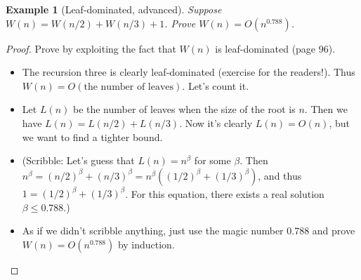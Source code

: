\documentclass[11pt,a4paper,oneside,microtype,nokorean]{oblivoir}
\newtheorem{example}{Example}
\begin{document}
\begin{example}[Leaf-dominated, advanced] Suppose $W(n) = W(n/2) + W(n/3) + 1$.  Prove
  $W(n) = O(n^{0.788})$.
\end{example}

\begin{proof}
  Prove by exploiting the fact that $W(n)$ is leaf-dominated (page 96).

  \begin{itemize}
  \item The recursion three is clearly leaf-dominated (exercise for the readers!).  Thus
    $W(n) = O(\mbox{the number of leaves})$.  Let's count it.

  \item Let $L(n)$ be the number of leaves when the size of the root is $n$.  Then we have
    $L(n) = L(n/2) + L(n/3)$.  Now it's clearly $L(n) = O(n)$, but we want to find a tighter bound.

  \item (Scribble: Let's guess that $L(n) = n^\beta$ for some $\beta$.  Then
    $n^\beta = (n/2)^\beta + (n/3)^\beta = n^\beta ((1/2)^\beta + (1/3)^\beta)$, and thus
    $1 = (1/2)^\beta + (1/3)^\beta$.  For this equation, there exists a real solution
    $\beta \le 0.788$.)

  \item As if we didn't scribble anything, just use the magic number $0.788$ and prove
    $W(n) = O(n^{0.788})$ by induction.
  \end{itemize}
\end{proof}
\end{document}
